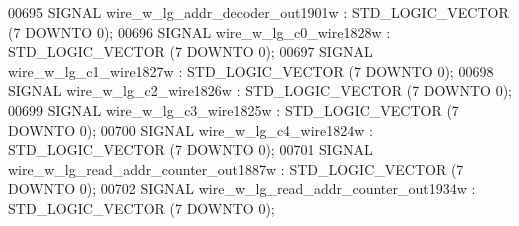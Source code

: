 \begin{DoxyCode}
{00695      \textcolor{keywordflow}{SIGNAL}  \textcolor{vhdlchar}{wire_w_lg_addr_decoder_out1901w}    \textcolor{vhdlchar}{:}   \textcolor{comment}{STD\_LOGIC\_VECTOR} \textcolor{vhdlchar}{(}\textcolor{vhdllogic}{}\textcolor{vhdllogic}{7} \textcolor{keywordflow}{DOWNTO} \textcolor{vhdllogic}{}\textcolor{vhdllogic}{0}\textcolor{vhdlchar}{)};
00696      \textcolor{keywordflow}{SIGNAL}  \textcolor{vhdlchar}{wire_w_lg_c0_wire1828w} \textcolor{vhdlchar}{:}   \textcolor{comment}{STD\_LOGIC\_VECTOR} \textcolor{vhdlchar}{(}\textcolor{vhdllogic}{}\textcolor{vhdllogic}{7} \textcolor{keywordflow}{DOWNTO} \textcolor{vhdllogic}{}\textcolor{vhdllogic}{0}\textcolor{vhdlchar}{)};
00697      \textcolor{keywordflow}{SIGNAL}  \textcolor{vhdlchar}{wire_w_lg_c1_wire1827w} \textcolor{vhdlchar}{:}   \textcolor{comment}{STD\_LOGIC\_VECTOR} \textcolor{vhdlchar}{(}\textcolor{vhdllogic}{}\textcolor{vhdllogic}{7} \textcolor{keywordflow}{DOWNTO} \textcolor{vhdllogic}{}\textcolor{vhdllogic}{0}\textcolor{vhdlchar}{)};
00698      \textcolor{keywordflow}{SIGNAL}  \textcolor{vhdlchar}{wire_w_lg_c2_wire1826w} \textcolor{vhdlchar}{:}   \textcolor{comment}{STD\_LOGIC\_VECTOR} \textcolor{vhdlchar}{(}\textcolor{vhdllogic}{}\textcolor{vhdllogic}{7} \textcolor{keywordflow}{DOWNTO} \textcolor{vhdllogic}{}\textcolor{vhdllogic}{0}\textcolor{vhdlchar}{)};
00699      \textcolor{keywordflow}{SIGNAL}  \textcolor{vhdlchar}{wire_w_lg_c3_wire1825w} \textcolor{vhdlchar}{:}   \textcolor{comment}{STD\_LOGIC\_VECTOR} \textcolor{vhdlchar}{(}\textcolor{vhdllogic}{}\textcolor{vhdllogic}{7} \textcolor{keywordflow}{DOWNTO} \textcolor{vhdllogic}{}\textcolor{vhdllogic}{0}\textcolor{vhdlchar}{)};
00700      \textcolor{keywordflow}{SIGNAL}  \textcolor{vhdlchar}{wire_w_lg_c4_wire1824w} \textcolor{vhdlchar}{:}   \textcolor{comment}{STD\_LOGIC\_VECTOR} \textcolor{vhdlchar}{(}\textcolor{vhdllogic}{}\textcolor{vhdllogic}{7} \textcolor{keywordflow}{DOWNTO} \textcolor{vhdllogic}{}\textcolor{vhdllogic}{0}\textcolor{vhdlchar}{)};
00701      \textcolor{keywordflow}{SIGNAL}  \textcolor{vhdlchar}{wire_w_lg_read_addr_counter_out1887w}   \textcolor{vhdlchar}{:}   \textcolor{comment}{STD\_LOGIC\_VECTOR} \textcolor{vhdlchar}{(}\textcolor{vhdllogic}{}\textcolor{vhdllogic}{7} \textcolor{keywordflow}{DOWNTO} \textcolor{vhdllogic}{}\textcolor{vhdllogic}{0}\textcolor{vhdlchar}{)};
00702      \textcolor{keywordflow}{SIGNAL}  \textcolor{vhdlchar}{wire_w_lg_read_addr_counter_out1934w}   \textcolor{vhdlchar}{:}   \textcolor{comment}{STD\_LOGIC\_VECTOR} \textcolor{vhdlchar}{(}\textcolor{vhdllogic}{}\textcolor{vhdllogic}{7} \textcolor{keywordflow}{DOWNTO} \textcolor{vhdllogic}{}\textcolor{vhdllogic}{0}\textcolor{vhdlchar}{)};
}
\end{DoxyCode}
